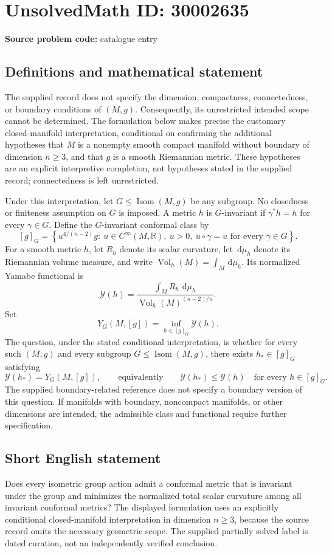 \documentclass[11pt]{article}
\newcommand{\R}{\mathbb{R}}
\newcommand{\dd}{\,\mathrm{d}}
\begin{document}
\section*{UnsolvedMath ID: 30002635}
\textbf{Source problem code:} catalogue entry
\subsection{Definitions and mathematical statement}
The supplied record does not specify the dimension, compactness, connectedness, or boundary conditions of \((M,g)\). Consequently, its unrestricted intended scope cannot be determined. The formulation below makes precise the customary closed-manifold interpretation, conditional on confirming the additional hypotheses that \(M\) is a nonempty smooth compact manifold without boundary of dimension \(n\geq 3\), and that \(g\) is a smooth Riemannian metric. These hypotheses are an explicit interpretive completion, not hypotheses stated in the supplied record; connectedness is left unrestricted.

Under this interpretation, let \(G\leq\operatorname{Isom}(M,g)\) be any subgroup. No closedness or finiteness assumption on \(G\) is imposed. A metric \(h\) is \(G\)-invariant if \(\gamma^*h=h\) for every \(\gamma\in G\). Define the \(G\)-invariant conformal class by
\[
[g]_G=\left\{u^{4/(n-2)}g:\ u\in C^\infty(M,\R),\ u>0,\ u\circ\gamma=u\text{ for every }\gamma\in G\right\}.
\]
For a smooth metric \(h\), let \(R_h\) denote its scalar curvature, let \(\dd\mu_h\) denote its Riemannian volume measure, and write \(\operatorname{Vol}_h(M)=\int_M\dd\mu_h\). Its normalized Yamabe functional is
\[
\mathcal{Y}(h)=\frac{\displaystyle\int_M R_h\,\dd\mu_h}{\displaystyle\operatorname{Vol}_h(M)^{(n-2)/n}}.
\]
Set
\[
Y_G(M,[g])=\inf_{h\in[g]_G}\mathcal{Y}(h).
\]
The question, under the stated conditional interpretation, is whether for every such \((M,g)\) and every subgroup \(G\leq\operatorname{Isom}(M,g)\), there exists \(h_*\in[g]_G\) satisfying
\[
\mathcal{Y}(h_*)=Y_G(M,[g]),
\qquad\text{equivalently}\qquad
\mathcal{Y}(h_*)\leq\mathcal{Y}(h)\quad\text{for every }h\in[g]_G.
\]
The supplied boundary-related reference does not specify a boundary version of this question. If manifolds with boundary, noncompact manifolds, or other dimensions are intended, the admissible class and functional require further specification.
\subsection{Short English statement}
Does every isometric group action admit a conformal metric that is invariant under the group and minimizes the normalized total scalar curvature among all invariant conformal metrics? The displayed formulation uses an explicitly conditional closed-manifold interpretation in dimension \(n\geq3\), because the source record omits the necessary geometric scope. The supplied partially solved label is dated curation, not an independently verified conclusion.
\end{document}
